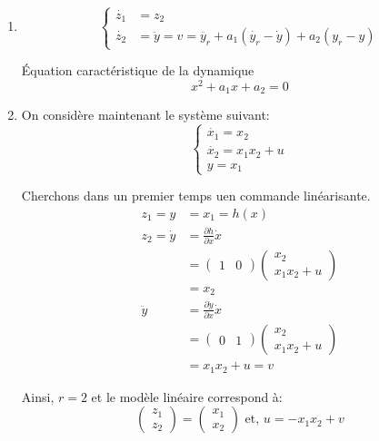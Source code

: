 \documentclass{../../td}{subfiles}
\begin{document}
\begin{enumerate}

\newpage
\item \[
    \begin{cases}
\dot{z_1} & = z_2 \\ \dot{z_2} & = \ddot{y} = v = \ddot{y_r} + a_1(\dot{y_r}-\dot{y})+a_2(y_r-y)
\end{cases}
\]

Équation caractéristique de la dynamique 
\[ x^2 + a_1 x + a_2 = 0 \]


\item On considère maintenant le système suivant:
\[\left\{\begin{matrix}
\dot{x_1} = x_2\\
\dot{x_2} = x_1x_2+u\\
y = x_1
\end{matrix} \right. \]

Cherchons dans un premier temps uen commande linéarisante.
\begin{align*}
z_1 = y &= x_1 = h(x)\\
z_2 = \dot{y} &= \frac{\partial h}{\partial x} \dot{x}\\
&= \begin{pmatrix}1 &0\end{pmatrix} \begin{pmatrix} x_2 \\ x_1x_2 + u\end{pmatrix}\\
&= x_2\\
\ddot{y} &= \frac{\partial \dot{y}}{\partial x} \dot{x}\\
&= \begin{pmatrix} 0 & 1\end{pmatrix} \begin{pmatrix}x_2 \\x_1x_2+u\end{pmatrix}\\
&= x_1x_2 + u = v
\end{align*}

Ainsi, $r=2$ et le modèle linéaire correspond à:
\[ \begin{pmatrix}z_1\\z_2\end{pmatrix} = \begin{pmatrix}
x_1 \\ x_2\end{pmatrix} \text{	et, } u = -x_1x_2 + v\]


\end{enumerate}
\end{document}
